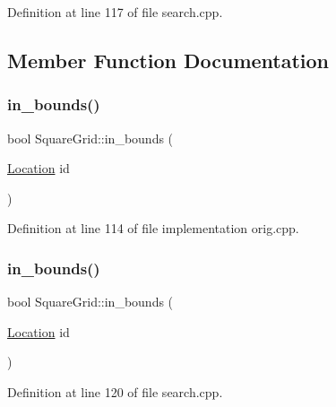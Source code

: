 Definition at line 117 of file search.\+cpp.



\subsection{Member Function Documentation}
\mbox{\label{struct_square_grid_a84bbaa9dad618228a2d6d3196254b86b}} 
\subsubsection{\texorpdfstring{in\+\_\+bounds()}{in\_bounds()}\hspace{0.1cm}{\footnotesize\ttfamily [1/2]}}
{\footnotesize\ttfamily bool Square\+Grid\+::in\+\_\+bounds (\begin{DoxyParamCaption}\item[{\hyperlink{struct_square_grid_a2c9a2cbd3912aa48ac97289abc3f1c0f}{Location}}]{id }\end{DoxyParamCaption})\hspace{0.3cm}{\ttfamily [inline]}}



Definition at line 114 of file implementation orig.\+cpp.

\mbox{\label{struct_square_grid_a84bbaa9dad618228a2d6d3196254b86b}} 
\subsubsection{\texorpdfstring{in\+\_\+bounds()}{in\_bounds()}\hspace{0.1cm}{\footnotesize\ttfamily [2/2]}}
{\footnotesize\ttfamily bool Square\+Grid\+::in\+\_\+bounds (\begin{DoxyParamCaption}\item[{\hyperlink{struct_square_grid_a2c9a2cbd3912aa48ac97289abc3f1c0f}{Location}}]{id }\end{DoxyParamCaption})\hspace{0.3cm}{\ttfamily [inline]}}



Definition at line 120 of file search.\+cpp.

